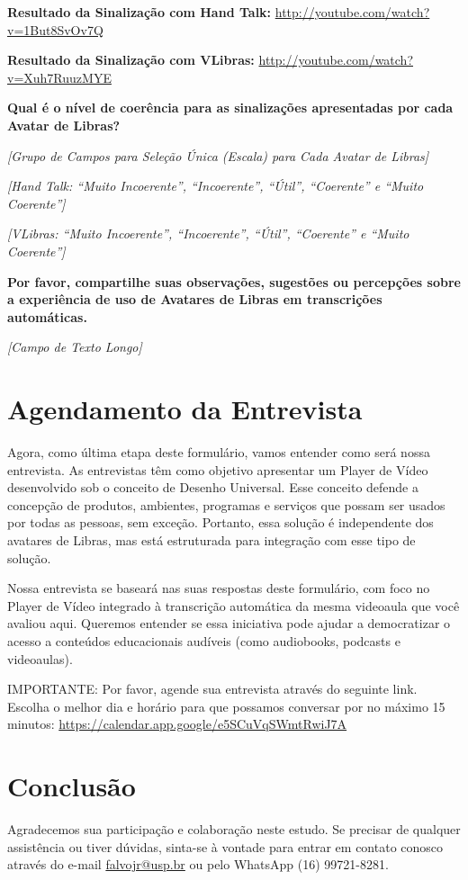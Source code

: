 \noindent
\textbf{Resultado da Sinalização com Hand Talk:} \url{http://youtube.com/watch?v=1But8SvOv7Q}

\noindent
\textbf{Resultado da Sinalização com VLibras:} \url{http://youtube.com/watch?v=Xuh7RuuzMYE}

\noindent
\textbf{Qual é o nível de coerência para as sinalizações apresentadas por cada Avatar de Libras?}

\noindent
\textit{[Grupo de Campos para Seleção Única (Escala) para Cada Avatar de Libras]}

\noindent
\textit{[Hand Talk: ``Muito Incoerente'', ``Incoerente'', ``Útil'', ``Coerente'' e ``Muito Coerente'']}

\noindent
\textit{[VLibras: ``Muito Incoerente'', ``Incoerente'', ``Útil'', ``Coerente'' e ``Muito Coerente'']}

\noindent
\textbf{Por favor, compartilhe suas observações, sugestões ou percepções sobre
a experiência de uso de Avatares de Libras em transcrições automáticas.}

\noindent
\textit{[Campo de Texto Longo]}

\section{Agendamento da Entrevista}

\noindent
Agora, como última etapa deste formulário, vamos entender como será nossa 
entrevista. As entrevistas têm como objetivo apresentar um Player de Vídeo 
desenvolvido sob o conceito de Desenho Universal. Esse conceito defende a concepção 
de produtos, ambientes, programas e serviços que possam ser usados por todas as 
pessoas, sem exceção. Portanto, essa solução é independente dos avatares de Libras, 
mas está estruturada para integração com esse tipo de solução.

\noindent
Nossa entrevista se baseará nas suas respostas deste formulário, com foco no Player de 
Vídeo integrado à transcrição automática da mesma videoaula que você avaliou aqui. 
Queremos entender se essa iniciativa pode ajudar a democratizar o acesso a conteúdos 
educacionais audíveis (como audiobooks, podcasts e videoaulas).

\noindent
IMPORTANTE: Por favor, agende sua entrevista através do seguinte link. Escolha o melhor 
dia e horário para que possamos conversar por no máximo 15 minutos: 
\url{https://calendar.app.google/e5SCuVqSWmtRwiJ7A}

\section{Conclusão}

\noindent
Agradecemos sua participação e colaboração neste estudo. Se precisar de qualquer 
assistência ou tiver dúvidas, sinta-se à vontade para entrar em contato conosco através do e-mail \href{mailto:falvojr@usp.br}{falvojr@usp.br} ou pelo WhatsApp (16) 99721-8281. 
